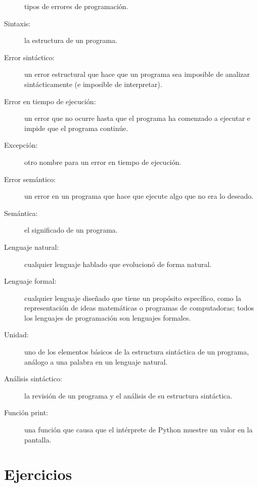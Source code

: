 \begin{description}
tipos de errores de programación.
\item [{Sintaxis:}] la estructura de un programa.
\item [{Error sintáctico:}] un error estructural que hace que un programa
sea imposible de analizar sintácticamente (e imposible de interpretar).
\item [{Error en tiempo de ejecución:}] un error que no ocurre hasta
que el programa ha comenzado a ejecutar e impide que el programa continúe.
\item [{Excepción:}] otro nombre para un error en tiempo de ejecución.
\item [{Error semántico:}] un error en un programa que hace que ejecute
algo que no era lo deseado.
\item [{Semántica:}] el significado de un programa.
\item [{Lenguaje natural:}] cualquier lenguaje hablado que evolucionó
de forma natural.
\item [{Lenguaje formal:}] cualquier lenguaje diseñado que tiene un propósito
específico, como la representación de ideas matemáticas o programas
de computadoras; todos los lenguajes de programación son lenguajes
formales.
\item [{Unidad:}] uno de los elementos básicos de la estructura sintáctica
de un programa, análogo a una palabra en un lenguaje natural.
\item [{Análisis sintáctico:}] la revisión de un programa y el análisis
de su estructura sintáctica.
\item [{Función print:}] una función que causa que el intérprete de Python
muestre un valor en la pantalla.

  
  
  
  
   
  
  
   
\end{description}

\section{Ejercicios}

